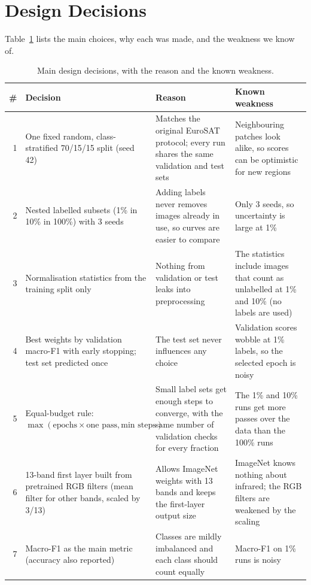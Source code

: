 \documentclass[conference]{IEEEtran}
\newcommand{\tabdir}{../results/tables}
\begin{document}


\section{Design Decisions}\label{app:design}
Table~\ref{tab:design} lists the main choices, why each was made, and the weakness we know of.

\begin{table}[t]
\centering
\caption{Main design decisions, with the reason and the known weakness.}
\label{tab:design}
\footnotesize
\begin{tabular}{r p{4.6cm} p{5.2cm} p{5.6cm}}
\toprule
\# & Decision & Reason & Known weakness \\
\midrule
1 & One fixed random, class-stratified 70/15/15 split (seed 42) & Matches the original EuroSAT protocol; every run shares the same validation and test sets & Neighbouring patches look alike, so scores can be optimistic for new regions \\
2 & Nested labelled subsets (1\% in 10\% in 100\%) with 3 seeds & Adding labels never removes images already in use, so curves are easier to compare & Only 3 seeds, so uncertainty is large at 1\% \\
3 & Normalisation statistics from the training split only & Nothing from validation or test leaks into preprocessing & The statistics include images that count as unlabelled at 1\% and 10\% (no labels are used) \\
4 & Best weights by validation macro-F1 with early stopping; test set predicted once & The test set never influences any choice & Validation scores wobble at 1\% labels, so the selected epoch is noisy \\
5 & Equal-budget rule: $\max(\text{epochs}\times\text{one pass},\text{min steps})$ & Small label sets get enough steps to converge, with the same number of validation checks for every fraction & The 1\% and 10\% runs get more passes over the data than the 100\% runs \\
6 & 13-band first layer built from pretrained RGB filters (mean filter for other bands, scaled by 3/13) & Allows ImageNet weights with 13 bands and keeps the first-layer output size & ImageNet knows nothing about infrared; the RGB filters are weakened by the scaling \\
7 & Macro-F1 as the main metric (accuracy also reported) & Classes are mildly imbalanced and each class should count equally & Macro-F1 on 1\% runs is noisy \\

\end{tabular}
\end{table}
\end{document}
